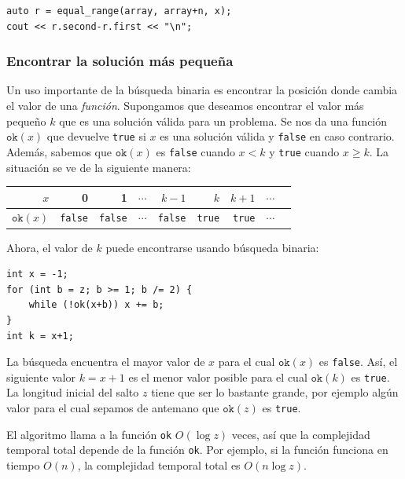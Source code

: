 \begin{lstlisting}
auto r = equal_range(array, array+n, x);
cout << r.second-r.first << "\n";
\end{lstlisting}

\subsubsection{Encontrar la solución más pequeña}

Un uso importante de la búsqueda binaria es
encontrar la posición donde cambia el valor de una \emph{función}.
Supongamos que deseamos encontrar el valor más pequeño $k$
que es una solución válida para un problema.
Se nos da una función $\texttt{ok}(x)$
que devuelve \texttt{true} si $x$ es una solución válida
y \texttt{false} en caso contrario.
Además, sabemos que $\texttt{ok}(x)$ es \texttt{false}
cuando $x<k$ y \texttt{true} cuando $x \ge k$.
La situación se ve de la siguiente manera:

\begin{center}
\begin{tabular}{r|rrrrrrrr}
$x$ & 0 & 1 & $\cdots$ & $k-1$ & $k$ & $k+1$ & $\cdots$ \\
\hline
$\texttt{ok}(x)$ & \texttt{false} & \texttt{false}
& $\cdots$ & \texttt{false} & \texttt{true} & \texttt{true} & $\cdots$ \\
\end{tabular}
\end{center}

\noindent
Ahora, el valor de $k$ puede encontrarse usando búsqueda binaria:

\begin{lstlisting}
int x = -1;
for (int b = z; b >= 1; b /= 2) {
    while (!ok(x+b)) x += b;
}
int k = x+1;
\end{lstlisting}

La búsqueda encuentra el mayor valor de $x$ para el cual
$\texttt{ok}(x)$ es \texttt{false}.
Así, el siguiente valor $k=x+1$
es el menor valor posible para el cual
$\texttt{ok}(k)$ es \texttt{true}.
La longitud inicial del salto $z$ tiene que ser
lo bastante grande, por ejemplo algún valor
para el cual sepamos de antemano que $\texttt{ok}(z)$ es \texttt{true}.

El algoritmo llama a la función \texttt{ok}
$O(\log z)$ veces, así que la complejidad temporal total
depende de la función \texttt{ok}.
Por ejemplo, si la función funciona en tiempo $O(n)$,
la complejidad temporal total es $O(n \log z)$.

